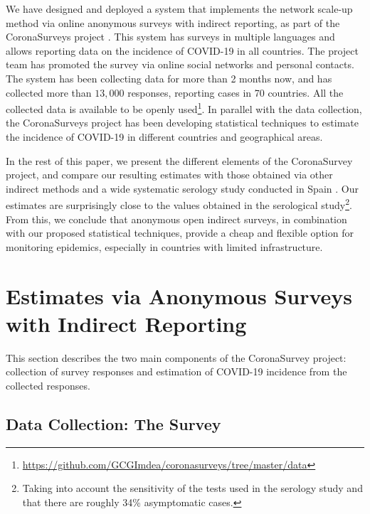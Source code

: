 \documentclass{article}
\newcommand{\af}[1]{{#1}}
\begin{document}
We have designed and deployed a system that implements the network scale-up method via \af{online} anonymous surveys with indirect reporting, as part of the CoronaSurveys project \cite{CoronaSurveys}. This system has surveys in multiple languages and allows reporting data on the incidence of COVID-19 in all countries. \af{The project team has promoted the survey via online social networks and personal contacts. The system} has been collecting data for more than 2 months now, and has collected more than $13,000$ responses, reporting cases in 70 countries. All the collected data is available to be openly used\footnote{\url{https://github.com/GCGImdea/coronasurveys/tree/master/data}}. In parallel with the data collection, the CoronaSurveys project has been developing statistical techniques to estimate the incidence of COVID-19 in different countries and geographical areas.

In the rest of this paper, we present the different elements of the CoronaSurvey project, and compare our resulting estimates with those obtained via other indirect methods and a wide systematic serology study conducted in Spain \cite{ENEcovid19}. Our estimates are surprisingly close to the values obtained in the serological study\footnote{\af{Taking into account the sensitivity of the tests used in the serology study and that there are roughly 34\% asymptomatic cases.}}. From this, we conclude that  
anonymous open indirect surveys, in combination with our proposed statistical techniques, provide a cheap and flexible option for monitoring
epidemics, especially in countries with limited infrastructure.

\section{Estimates via Anonymous Surveys with Indirect Reporting}

This section describes the two main components of the CoronaSurvey project: collection of survey responses and estimation of COVID-19 incidence from the collected responses.

\subsection{Data Collection: The Survey}
\end{document}
